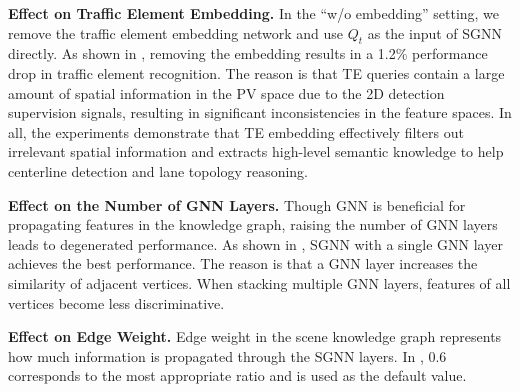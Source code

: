 \begin{table}[t!]
    \centering
\caption{\textbf{Ablation on edge weight} in the scene knowledge graph.}
    \label{tab:ab:weight}
    \vspace{-5px}
\end{table} 

\smallskip
\noindent
\textbf{Effect on Traffic Element Embedding.}
In the ``w/o embedding'' setting, we remove the traffic element embedding network and use $Q_t$ as the input of SGNN directly.
As shown in , removing the embedding results in a 1.2\% performance drop in traffic element recognition.
The reason is that TE queries contain a large amount of spatial information in the PV space due to the 2D detection supervision signals, resulting in significant inconsistencies in the feature spaces.
In all, the experiments demonstrate that TE embedding effectively filters out irrelevant spatial information and extracts high-level semantic knowledge to help centerline detection and lane topology reasoning.




\smallskip
\noindent
\textbf{Effect on the Number of GNN Layers.}
Though GNN is beneficial for propagating features in the knowledge graph, raising the number of GNN layers leads to degenerated performance. As shown in , SGNN with a single GNN layer achieves the best performance. The reason is that a GNN layer increases the similarity of adjacent vertices. When stacking multiple GNN layers, features of all vertices become less discriminative.






\smallskip
\noindent
\textbf{Effect on Edge Weight.}
Edge weight in the scene knowledge graph represents how much information is propagated through the SGNN layers. In , 0.6 corresponds to the most appropriate ratio and is used as the default value.


